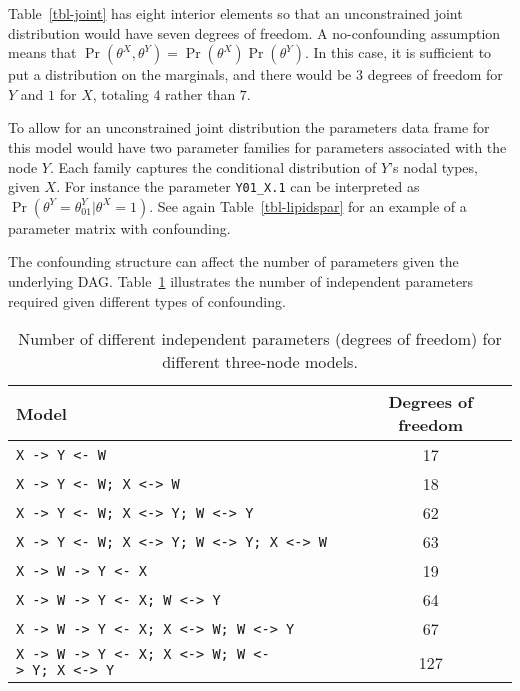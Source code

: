 \documentclass[
  11pt,
  article]{jss}
\begin{document}
Table~\ref{tbl-joint} has eight interior elements so that an
unconstrained joint distribution would have seven degrees of freedom. A
no-confounding assumption means that
\(\Pr(\theta^X, \theta^Y) = \Pr(\theta^X)\Pr(\theta^Y)\). In this case,
it is sufficient to put a distribution on the marginals, and there would
be \(3\) degrees of freedom for \(Y\) and \(1\) for \(X\), totaling
\(4\) rather than \(7\).

To allow for an unconstrained joint distribution the parameters data
frame for this model would have two parameter families for parameters
associated with the node \(Y\). Each family captures the conditional
distribution of \(Y\)'s nodal types, given \(X\). For instance the
parameter \texttt{Y01\_X.1} can be interpreted as
\(\Pr(\theta^Y = \theta^Y_{01} | \theta^X=1)\). See again
Table~\ref{tbl-lipidspar} for an example of a parameter matrix with
confounding.

The confounding structure can affect the number of parameters given the
underlying DAG. Table~\ref{tbl-dof} illustrates the number of
independent parameters required given different types of confounding.

\begin{longtable}[]{@{}lc@{}}

\caption{\label{tbl-dof}Number of different independent parameters
(degrees of freedom) for different three-node models.}

\tabularnewline

\toprule\noalign{}
Model & Degrees of freedom \\
\midrule\noalign{}
\endhead
\bottomrule\noalign{}
\endlastfoot
\texttt{X\ -\textgreater{}\ Y\ \textless{}-\ W} & 17 \\
\texttt{X\ -\textgreater{}\ Y\ \textless{}-\ W;\ X\ \textless{}-\textgreater{}\ W}
& 18 \\
\texttt{X\ -\textgreater{}\ Y\ \textless{}-\ W;\ X\ \textless{}-\textgreater{}\ Y;\ W\ \textless{}-\textgreater{}\ Y}
& 62 \\
\texttt{X\ -\textgreater{}\ Y\ \textless{}-\ W;\ X\ \textless{}-\textgreater{}\ Y;\ W\ \textless{}-\textgreater{}\ Y;\ X\ \textless{}-\textgreater{}\ W}
& 63 \\
\texttt{X\ -\textgreater{}\ W\ -\textgreater{}\ Y\ \textless{}-\ X} &
19 \\
\texttt{X\ -\textgreater{}\ W\ -\textgreater{}\ Y\ \textless{}-\ X;\ W\ \textless{}-\textgreater{}\ Y}
& 64 \\
\texttt{X\ -\textgreater{}\ W\ -\textgreater{}\ Y\ \textless{}-\ X;\ X\ \textless{}-\textgreater{}\ W;\ W\ \textless{}-\textgreater{}\ Y}
& 67 \\
\texttt{X\ -\textgreater{}\ W\ -\textgreater{}\ Y\ \textless{}-\ X;\ X\ \textless{}-\textgreater{}\ W;\ W\ \textless{}-\textgreater{}\ Y;\ X\ \textless{}-\textgreater{}\ Y}
& 127 \\

\end{longtable}
\end{document}
